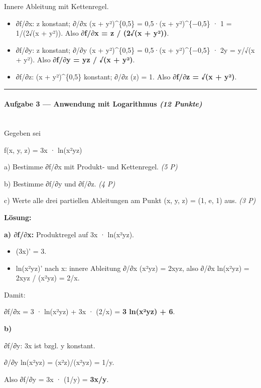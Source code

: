 \documentclass[11pt, a4paper]{article}
\begin{document}
Innere Ableitung mit Kettenregel.


\begin{itemize}
  \item ∂f/∂x: z konstant; ∂/∂x (x + y²)\textasciicircum{}\{0,5\} = 0,5·(x + y²)\textasciicircum{}\{−0,5\} · 1 = 1/(2√(x + y²)). Also \textbf{∂f/∂x = z / (2√(x + y²))}.
  \item ∂f/∂y: z konstant; ∂/∂y (x + y²)\textasciicircum{}\{0,5\} = 0,5·(x + y²)\textasciicircum{}\{−0,5\} · 2y = y/√(x + y²). Also \textbf{∂f/∂y = yz / √(x + y²)}.
  \item ∂f/∂z: (x + y²)\textasciicircum{}\{0,5\} konstant; ∂/∂z (z) = 1. Also \textbf{∂f/∂z = √(x + y²)}.
\end{itemize}


\noindent\textcolor{rulegray}{\rule{\linewidth}{0.4pt}}


\paragraph{Aufgabe 3 — Anwendung mit Logarithmus \textit{(12 Punkte)}}\mbox{}\\[2pt]

Gegeben sei


f(x, y, z) = 3x · ln(x²yz)


a) Bestimme ∂f/∂x mit Produkt- und Kettenregel. \textit{(5 P)}


b) Bestimme ∂f/∂y und ∂f/∂z. \textit{(4 P)}


c) Werte alle drei partiellen Ableitungen am Punkt (x, y, z) = (1, e, 1) aus. \textit{(3 P)}


\textbf{Lösung:}


\textbf{a) ∂f/∂x:} Produktregel auf 3x · ln(x²yz).


\begin{itemize}
  \item (3x)' = 3.
  \item ln(x²yz)' nach x: innere Ableitung ∂/∂x (x²yz) = 2xyz, also ∂/∂x ln(x²yz) = 2xyz / (x²yz) = 2/x.
\end{itemize}

Damit:

∂f/∂x = 3 · ln(x²yz) + 3x · (2/x) = \textbf{3 ln(x²yz) + 6}.


\textbf{b)}


∂f/∂y: 3x ist bzgl. y konstant.

∂/∂y ln(x²yz) = (x²z)/(x²yz) = 1/y.

Also ∂f/∂y = 3x · (1/y) = \textbf{3x/y}.
\end{document}
